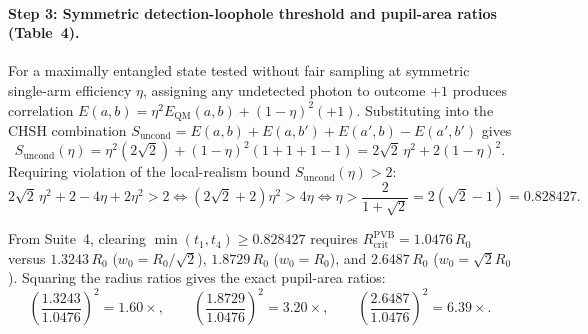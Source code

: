 \documentclass[10pt,letterpaper]{article}
\numberwithin{equation}{section}
\begin{document}
\paragraph*{Step 3: Symmetric detection-loophole threshold and pupil-area ratios (Table~4).}
For a maximally entangled state tested without fair sampling at symmetric single-arm efficiency $\eta$, assigning any undetected photon to outcome $+1$ produces correlation $E(a,b) = \eta^2 E_{\mathrm{QM}}(a,b) + (1-\eta)^2(+1)$. Substituting into the CHSH combination $S_{\mathrm{uncond}} = E(a,b) + E(a,b') + E(a',b) - E(a',b')$ gives
\begin{equation}
  S_{\mathrm{uncond}}(\eta) = \eta^2(2\sqrt{2}) + (1-\eta)^2(1 + 1 + 1 - 1) = 2\sqrt{2}\,\eta^2 + 2(1-\eta)^2.
\end{equation}
Requiring violation of the local-realism bound $S_{\mathrm{uncond}}(\eta) > 2$:
\begin{equation}
  2\sqrt{2}\,\eta^2 + 2 - 4\eta + 2\eta^2 > 2 \iff (2\sqrt{2} + 2)\eta^2 > 4\eta \iff \eta > \frac{2}{1+\sqrt{2}} = 2(\sqrt{2}-1) = \mathbf{0.828427}.
\end{equation}
\begin{pencheck}
From Suite~4, clearing $\min(t_1,t_4) \ge 0.828427$ requires $R_{\mathrm{crit}}^{\mathrm{PVB}} = 1.0476\,R_0$ versus $1.3243\,R_0$ ($w_0 = R_0/\sqrt{2}$), $1.8729\,R_0$ ($w_0 = R_0$), and $2.6487\,R_0$ ($w_0 = \sqrt{2}R_0$). Squaring the radius ratios gives the exact pupil-area ratios:
\[
  \left(\frac{1.3243}{1.0476}\right)^2 = \mathbf{1.60\times}, \qquad
  \left(\frac{1.8729}{1.0476}\right)^2 = \mathbf{3.20\times}, \qquad
  \left(\frac{2.6487}{1.0476}\right)^2 = \mathbf{6.39\times}.
\]
\end{pencheck}
\end{document}
